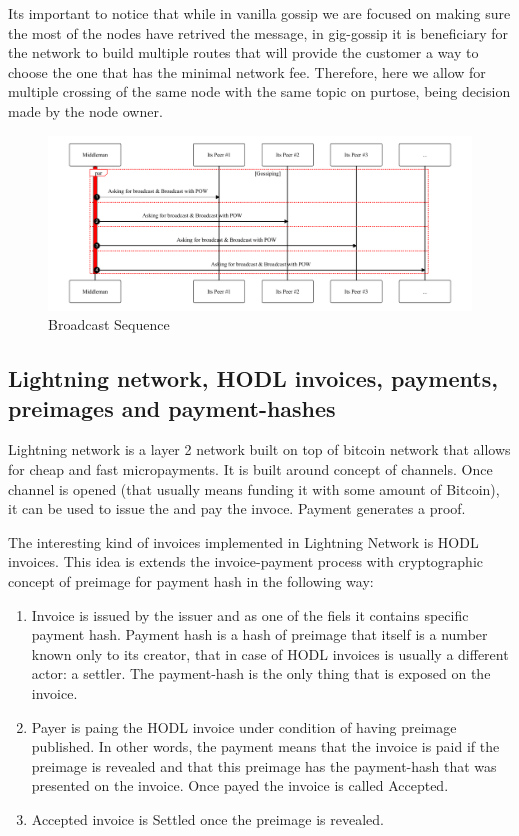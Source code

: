 \documentclass{article}
\begin{document}
Its important to notice that while in vanilla gossip we are focused on making sure the most of the nodes have retrived the message, in gig-gossip it is beneficiary for the network to build multiple routes that will provide the customer a way to choose the one that has the minimal network fee. Therefore, here we allow for multiple crossing of the same node with the same topic on purtose, being decision made by the node owner.

\begin{figure}
	\centering
	\includegraphics[scale=0.8]{BroadcastSequence.pdf}
	\caption{Broadcast Sequence}
	\label{fig:fr:broadcastsequence}
\end{figure}

\subsection{Lightning network, HODL invoices, payments, preimages and payment-hashes}

Lightning network is a layer 2 network built on top of bitcoin network that allows for cheap and fast micropayments.
It is built around concept of channels. Once channel is opened (that usually means funding it with some amount of Bitcoin), it can be used to issue the and pay the invoce. Payment generates a proof. 

The interesting kind of invoices implemented in Lightning Network is HODL invoices. This idea is extends the invoice-payment process with cryptographic concept of preimage for payment hash in the following way:
\begin{enumerate}
	\item Invoice is issued by the issuer and as one of the fiels it contains specific payment hash. Payment hash is a hash of preimage that itself is a number known only to its creator, that in case of HODL invoices is usually a different actor: a settler. The payment-hash is the only thing that is exposed on the invoice.
	\item Payer is paing the HODL invoice under condition of having preimage published. In other words, the payment means that the invoice is paid if the preimage is revealed and that this preimage has the payment-hash that was presented on the invoice. Once payed the invoice is called Accepted.
	\item Accepted invoice is Settled once the preimage is revealed.
\end{enumerate}
\end{document}
